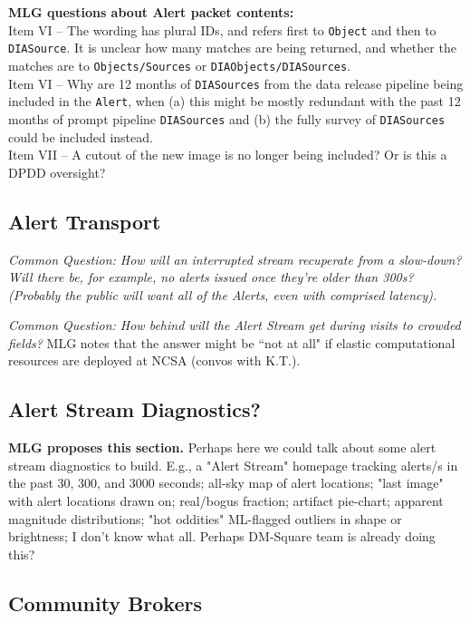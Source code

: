 {\bf MLG questions about Alert packet contents:} \\
Item VI -- The wording has plural IDs, and refers first to {\tt Object} and then to {\tt DIASource}.
It is unclear how many matches are being returned, and whether the matches are to {\tt Objects/Sources} or {\tt DIAObjects/DIASources}.
\\
Item VI -- Why are 12 months of {\tt DIASources} from the data release pipeline being included in the {\tt Alert}, when (a) this might be mostly redundant with the past 12 months of prompt pipeline {\tt DIASources} and (b) the fully survey of {\tt DIASources} could be included instead.
\\
Item VII -- A cutout of the new image is no longer being included?
Or is this a DPDD oversight?

\subsection{Alert Transport}

{\it Common Question: How will an interrupted stream recuperate from a slow-down?
Will there be, for example, no alerts issued once they're older than 300s?
(Probably the public will want all of the Alerts, even with comprised latency).}

{\it Common Question: How behind will the Alert Stream get during visits to crowded fields?} MLG notes that the answer might be ``not at all" if elastic computational resources are deployed at NCSA (convos with K.T.).


\subsection{Alert Stream Diagnostics?}

{\bf MLG proposes this section.} Perhaps here we could talk about some alert stream diagnostics to build.
E.g., a "Alert Stream" homepage tracking alerts/s in the past 30, 300, and 3000 seconds; all-sky map of alert locations; "last image" with alert locations drawn on; real/bogus fraction; artifact pie-chart; apparent magnitude distributions; "hot oddities" ML-flagged outliers in shape or brightness; I don't know what all.
Perhaps DM-Square team is already doing this?


\subsection{Community Brokers}

